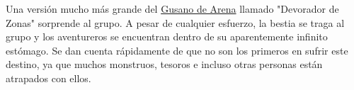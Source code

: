 \begin{description}[leftmargin=*]
 \item[\color{accent} Devorador de Zonas:] Una versión mucho más grande del \hyperlink{abyssworm}{Gusano de Arena} llamado "Devorador de Zonas" sorprende al grupo. A pesar de cualquier esfuerzo, la bestia se traga al grupo y los aventureros se encuentran dentro de su aparentemente infinito estómago. Se dan cuenta rápidamente de que no son los primeros en sufrir este destino, ya que muchos monstruos, tesoros e incluso otras personas están atrapados con ellos.
\end{description}
\pagebreak
